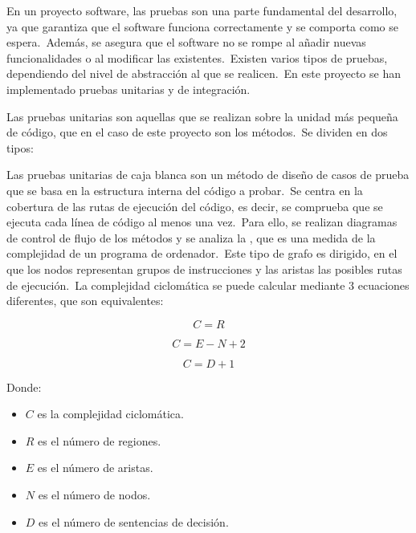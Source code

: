 En un proyecto software, las pruebas son una parte fundamental del desarrollo, ya que garantiza que el software funciona
correctamente y se comporta como se espera.\ Además, se asegura que el software no se rompe al añadir nuevas
funcionalidades o al modificar las existentes.\ Existen varios tipos de pruebas, dependiendo del nivel de abstracción
al que se realicen.\ En este proyecto se han implementado pruebas unitarias y de integración.


Las pruebas unitarias son aquellas que se realizan sobre la unidad más pequeña de código, que en el caso de este
proyecto son los métodos.\ Se dividen en dos tipos:


Las pruebas unitarias de caja blanca son un método de diseño de casos de prueba que se basa en la estructura interna
del código a probar.\ Se centra en la cobertura de las rutas de ejecución del código, es decir, se comprueba que se
ejecuta cada línea de código al menos una vez.\ Para ello, se realizan diagramas de control de flujo de los métodos y se
analiza la , que es una medida de la complejidad de un programa de
ordenador.\ Este tipo de grafo es dirigido, en el que los
nodos representan grupos de instrucciones y las aristas las posibles rutas de ejecución.\ La complejidad ciclomática
se puede calcular mediante 3 ecuaciones diferentes, que son equivalentes:

\begin{center}
	\begin{equation}
		C = R
		\label{eq:complejidad-ciclomatica-1}
	\end{equation}

	\begin{equation}
		C = E - N + 2
		\label{eq:complejidad-ciclomatica-2}
	\end{equation}

	\begin{equation}
		C = D + 1
		\label{eq:complejidad-ciclomatica-3}
	\end{equation}
\end{center}

Donde:
\begin{itemize}
	\item $C$ es la complejidad ciclomática.
	\item $R$ es el número de regiones.
	\item $E$ es el número de aristas.
	\item $N$ es el número de nodos.
	\item $D$ es el número de sentencias de decisión.
\end{itemize}

